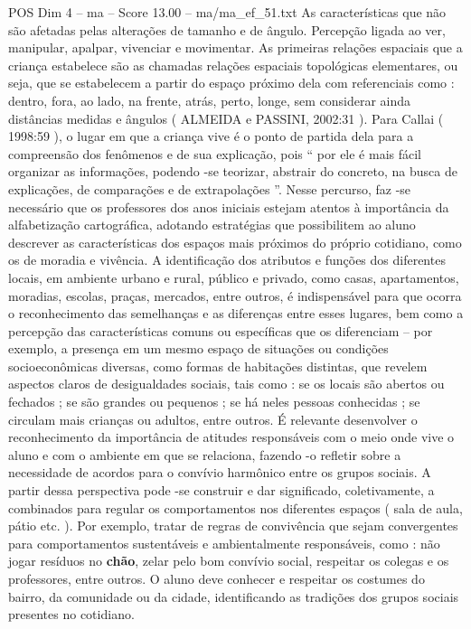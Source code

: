 \begin{textsample}{POS Dim 4 – ma – Score 13.00 – ma/ma\_ef\_51.txt}
As características que não são afetadas pelas alterações de tamanho e de ângulo.
Percepção ligada ao ver, manipular, apalpar, vivenciar e movimentar.
As primeiras relações espaciais que a criança estabelece são as chamadas relações espaciais topológicas elementares, ou seja, que se estabelecem a partir do espaço próximo dela com referenciais como : dentro, fora, ao lado, na frente, atrás, perto, longe, sem considerar ainda distâncias medidas e ângulos ( ALMEIDA e PASSINI, 2002:31 ).
Para Callai ( 1998:59 ), o lugar em que a criança vive é o ponto de partida dela para a compreensão dos fenômenos e de sua explicação, pois “ por ele é mais fácil organizar as informações, podendo -se teorizar, abstrair do concreto, na busca de explicações, de comparações e de extrapolações ”.
Nesse percurso, faz -se necessário que os professores dos anos iniciais estejam atentos à importância da alfabetização cartográfica, adotando estratégias que possibilitem ao aluno descrever as características dos espaços mais próximos do próprio cotidiano, como os de moradia e vivência.
A identificação dos atributos e funções dos diferentes locais, em ambiente urbano e rural, público e privado, como casas, apartamentos, moradias, escolas, praças, mercados, entre outros, é indispensável para que ocorra o reconhecimento das semelhanças e as diferenças entre esses lugares, bem como a percepção das características comuns ou específicas que os diferenciam – por exemplo, a presença em um mesmo espaço de situações ou condições socioeconômicas diversas, como formas de habitações distintas, que revelem aspectos claros de desigualdades sociais, tais como : se os locais são abertos ou fechados ; se são grandes ou pequenos ; se há neles pessoas conhecidas ; se circulam mais crianças ou adultos, entre outros.
É relevante desenvolver o reconhecimento da importância de atitudes responsáveis com o meio onde vive o aluno e com o ambiente em que se relaciona, fazendo -o refletir sobre a necessidade de acordos para o convívio harmônico entre os grupos sociais.
A partir dessa perspectiva pode -se construir e dar significado, coletivamente, a combinados para regular os comportamentos nos diferentes espaços ( sala de aula, pátio etc. ).
Por exemplo, tratar de regras de convivência que sejam convergentes para comportamentos sustentáveis e ambientalmente responsáveis, como : não jogar resíduos no \textbf{chão}, zelar pelo bom convívio social, respeitar os colegas e os professores, entre outros.
O aluno deve conhecer e respeitar os costumes do bairro, da comunidade ou da cidade, identificando as tradições dos grupos sociais presentes no cotidiano.

\end{textsample}

